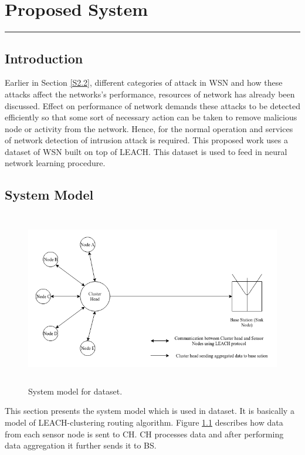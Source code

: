 \chapter{Proposed System}
\label{C5} %
\graphicspath{{Figures/PDF}}
\noindent\rule{\linewidth}{2pt}
\section{Introduction} \label{S5.1}
Earlier in Section \ref{S2.2}, different categories of attack in WSN and how these attacks affect the networks's performance, resources of network has already been discussed. Effect on performance of network demands these attacks to be detected efficiently so that some sort of necessary action can be taken to remove malicious node or activity from the network. Hence, for the normal operation and services of network detection of intrusion attack is required. This proposed work uses a dataset of WSN built on top of LEACH. This dataset is used to feed in neural network learning procedure.
\section{System Model} \label{S5.2}
    \begin{figure}[h]
    \center	
    \includegraphics[width=5.5in, height=3in]{Figures/PNG/SystemModel.png}
    \caption{System model for dataset.}
    \label{SystemModel}	
    \end{figure}
This section presents the system model which is used in dataset. It is basically a model of LEACH-clustering routing algorithm. Figure \ref{SystemModel} describes how data from each sensor node is sent to CH. CH processes data and after performing data aggregation it further sends it to BS.
